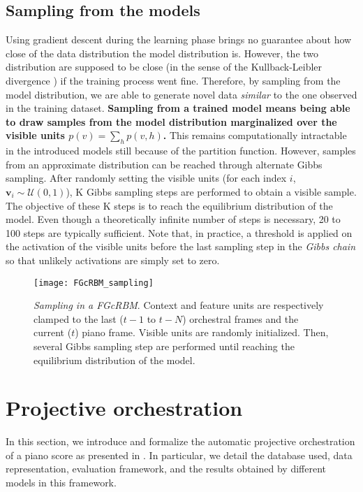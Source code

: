 \documentclass[letterpaper]{article}
\begin{document}
\subsection{Sampling from the models}
Using gradient descent during the learning phase brings no guarantee about how close of the data distribution the model distribution is. However, the two distribution are supposed to be close (in the sense of the Kullback-Leibler divergence \cite{hinton2002training}) if the training process went fine.
Therefore, by sampling from the model distribution, we are able to generate novel data \textit{similar} to the one observed in the training dataset. 
\textbf{Sampling from a trained model means being able to draw samples from the model distribution marginalized over the visible units $p(v) = \sum_{h} p(v,h)$.}
This remains computationally intractable in the introduced models still because of the partition function. However, samples from an approximate distribution can be reached through alternate Gibbs sampling. After randomly setting the visible units (for each index $i$, $\bm{v}_{i} \sim \mathcal{U}(0,1)$), K Gibbs sampling steps are performed to obtain a visible sample. The objective of these K steps is to reach the equilibrium distribution of the model. Even though a theoretically  infinite number of steps is necessary, 20 to 100 steps are typically sufficient.
Note that, in practice, a threshold is applied on the activation of the visible units before the last sampling step in the \textit{Gibbs chain} so that unlikely activations are simply set to zero.

\begin{figure}
\centering
\texttt{[image: FGcRBM\_sampling]}
\caption{\textit{Sampling in a FGcRBM}. Context and feature units are respectively clamped to the last ($t-1$ to $t-N$) orchestral frames and the current ($t$) piano frame. Visible units are randomly initialized. Then, several Gibbs sampling step are performed until reaching the equilibrium distribution of the model.}
\label{fig:FGcRBM_sampling}
\end{figure}


\section{Projective orchestration}
In this section, we introduce and formalize the automatic projective orchestration of a piano score as presented in . In particular, we detail the database used, data representation, evaluation framework, and the results obtained by different models in this framework.
\end{document}
